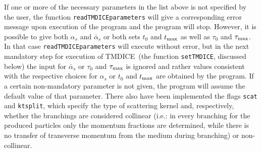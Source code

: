 \documentclass[preprint,12pt]{elsarticle}
\newcommand{\tmdice}{{\sf TMDICE}}
\begin{document}
%
If one or more of the necessary parameters in the list above is not specified by the user, the function \texttt{readTMDICEparameters} will give a corresponding error message upon execution of the program and the program will stop. However, it is possible to give both $\alpha_s$ and $\bar{\alpha}_s$ or both sets $t_0$ and $t_{\rm max}$ as well as $\tau_0$ and $\tau_{\rm max}$. In that case \texttt{readTMDICEparameters} will execute without error, but in the next mandatory step for execution of \tmdice~(the function \texttt{setTMDICE}, discussed below) the input for $\bar{\alpha}_s$ or $\tau_0$ and $\tau_{\rm max}$ is ignored and rather values consistent with the respective choices for $\alpha_s$ or $t_0$ and $t_{\rm max}$ are obtained by the program.
If a certain non-mandatory parameter is not given, the program will assume the default value of that parameter. 
There also have been implemented the flags \verb#scat# and \verb#ktsplit#, which specify the type of scattering kernel and, respectively, whether the branchings are considered collinear (i.e.: in every branching for the produced particles only the momentum fractions are determined, while there is no transfer of transverse momentum from the medium during branching) or non-collinear.
\end{document}
